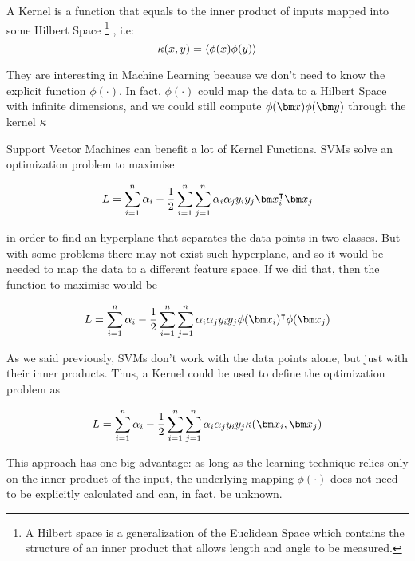 \begin{pre-delivery}
  A Kernel is a function that equals to the inner product of inputs mapped into
  some Hilbert Space
  \footnote{A Hilbert space is a generalization of the Euclidean Space which contains
  the structure of an inner product that allows length and angle to be
  measured.}
  , i.e:
  \begin{equation}
  \kappa(x,y) = \langle \phi(x)\phi(y) \rangle
\end{equation}

They are interesting in Machine Learning because we don't need to know the
explicit function $\phi(\cdot)$. In fact, $\phi(\cdot)$ could map the data to
a Hilbert Space with infinite dimensions, and we could still compute
$\phi(\vx)\phi(\vy)$ through the kernel $\kappa$

Support Vector Machines can benefit a lot of Kernel Functions. SVMs solve an
optimization problem to maximise

\begin{equation}
  L = \sum_{i = 1}^n\alpha_i -\frac{1}{2}\sum_{i = 1}^n\sum_{j = 1}^n\alpha_i\alpha_jy_iy_j\vx_i^\transp\vx_j
\end{equation}

in order to find an hyperplane that separates the data points in two classes.
But with some problems there may not exist such hyperplane, and so it would
be needed to map the data to a different feature space. If we did that, then
the function to maximise would be

\begin{equation}
  L = \sum_{i = 1}^n\alpha_i -\frac{1}{2}\sum_{i = 1}^n\sum_{j = 1}^n\alpha_i\alpha_jy_iy_j\phi(\vx_i)^\transp\phi(\vx_j)
\end{equation}

As we said previously, SVMs don't work with the data points alone, but just with
their inner products. Thus, a Kernel could be used to define the optimization
problem as

\begin{equation}
  L = \sum_{i = 1}^n\alpha_i -\frac{1}{2}\sum_{i = 1}^n\sum_{j = 1}^n\alpha_i\alpha_jy_iy_j\kernel(\vx_i, \vx_j)
\end{equation}

This approach has one big advantage:
as long as the learning technique relies
only on the inner product of the input, the underlying mapping $\phi(\cdot)$
does not need to be explicitly calculated and can, in fact, be unknown.


\end{pre-delivery}

